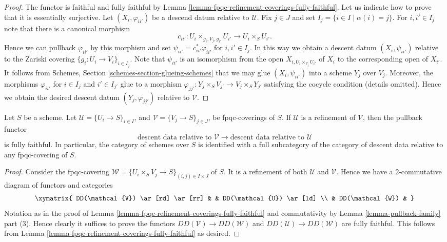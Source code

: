 \begin{proof}
The functor is faithful and fully faithful by
Lemma \ref{lemma-fpqc-refinement-coverings-fully-faithful}.
Let us indicate how to prove that it is essentially surjective.
Let $(X_i, \varphi_{ii'})$ be a descend datum relative to $\mathcal{U}$.
Fix $j \in J$ and set $I_j = \{i \in I \mid \alpha(i) = j\}$.
For $i, i' \in I_j$ note that there is a canonical morphism
$$
c_{ii'} : U_i \times_{g_i, V_j, g_{i'}} U_{i'} \to U_i \times_S U_{i'}.
$$
Hence we can pullback $\varphi_{ii'}$ by this morphism
and set $\psi_{ii'} = c_{ii'}^*\varphi_{ii'}$ for $i, i' \in I_j$.
In this way we obtain a descent datum $(X_i, \psi_{ii'})$
relative to the Zariski covering
$\{g_i : U_i \to V_i\}_{i \in I_j}$.
Note that $\psi_{ii'}$ is an isomorphism from the open
$X_{i, U_i \times_{V_j} U_{i'}}$ of $X_i$ to the corresponding
open of $X_{i'}$. It follows from
Schemes, Section \ref{schemes-section-glueing-schemes}
that we may glue $(X_i, \psi_{ii'})$ into a scheme
$Y_j$ over $V_j$. Moreover, the morphisms $\varphi_{ii'}$
for $i \in I_j$ and $i' \in I_{j'}$ glue to a morphism
$\varphi_{jj'} : Y_j \times_S V_{j'} \to V_j \times_S Y_{j'}$
satisfying the cocycle condition (details omitted).
Hence we obtain the desired descent datum
$(Y_j, \varphi_{jj'})$ relative to $\mathcal{V}$.
\end{proof}

\begin{lemma}
\label{lemma-refine-coverings-fully-faithful}
Let $S$ be a scheme.
Let $\mathcal{U} = \{U_i \to S\}_{i \in I}$, and
$\mathcal{V} = \{V_j \to S\}_{j \in J}$,
be fpqc-coverings of $S$.
If $\mathcal{U}$ is a refinement of $\mathcal{V}$,
then the pullback functor
$$
\text{descent data relative to }
\mathcal{V}
\longrightarrow
\text{descent data relative to }
\mathcal{U}
$$
is fully faithful.
In particular, the category of schemes over $S$
is identified with a full subcategory of the category
of descent data relative to any fpqc-covering of $S$.
\end{lemma}

\begin{proof}
Consider the fpqc-covering
$\mathcal{W} = \{U_i \times_S V_j \to S\}_{(i, j) \in I \times J}$ of $S$.
It is a refinement of both $\mathcal{U}$ and $\mathcal{V}$.
Hence we have a $2$-commutative diagram of functors and categories
$$
\xymatrix{
DD(\mathcal{V}) \ar[rd] \ar[rr] & & DD(\mathcal{U}) \ar[ld] \\
& DD(\mathcal{W}) &
}
$$
Notation as in the proof of
Lemma \ref{lemma-fpqc-refinement-coverings-fully-faithful} and
commutativity by Lemma \ref{lemma-pullback-family} part (3).
Hence clearly it suffices to prove the functors
$DD(\mathcal{V}) \to DD(\mathcal{W})$ and
$DD(\mathcal{U}) \to DD(\mathcal{W})$ are fully faithful.
This follows from
Lemma \ref{lemma-fpqc-refinement-coverings-fully-faithful}
as desired.
\end{proof}

